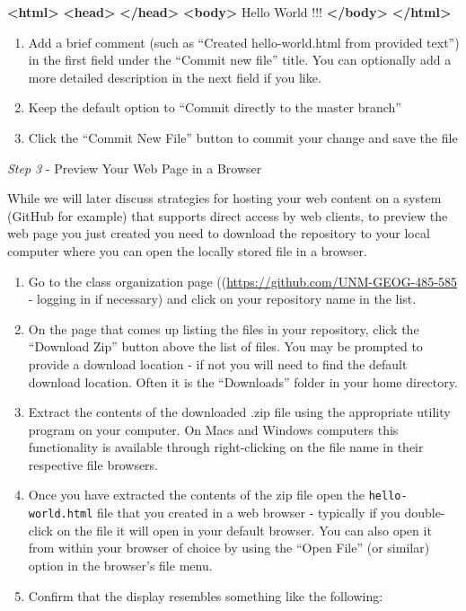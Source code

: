 \documentclass[]{book}
\providecommand{\tightlist}{%
  \setlength{\itemsep}{0pt}\setlength{\parskip}{0pt}}
\newenvironment{Shaded}{}{}
\newcommand{\KeywordTok}[1]{\textcolor[rgb]{0.00,0.44,0.13}{\textbf{{#1}}}}
\newcommand{\NormalTok}[1]{{#1}}
\begin{document}
\begin{Shaded}
\begin{Highlighting}[numbers=left,,]
\KeywordTok{<html>}
    \KeywordTok{<head>}
    \KeywordTok{</head>}     
    \KeywordTok{<body>}
        \NormalTok{Hello World !!!}
    \KeywordTok{</body>} 
\KeywordTok{</html>}
\end{Highlighting}
\end{Shaded}

\begin{enumerate}
\def\labelenumi{\arabic{enumi}.}
\setcounter{enumi}{4}
\tightlist
\item
  Add a brief comment (such as ``Created hello-world.html from provided
  text'') in the first field under the ``Commit new file'' title. You
  can optionally add a more detailed description in the next field if
  you like.
\item
  Keep the default option to ``Commit directly to the master branch''
\item
  Click the ``Commit New File'' button to commit your change and save
  the file
\end{enumerate}

\emph{Step 3} - Preview Your Web Page in a Browser

While we will later discuss strategies for hosting your web content on a
system (GitHub for example) that supports direct access by web clients,
to preview the web page you just created you need to download the
repository to your local computer where you can open the locally stored
file in a browser.

\begin{enumerate}
\def\labelenumi{\arabic{enumi}.}
\tightlist
\item
  Go to the class organization page
  ((\url{https://github.com/UNM-GEOG-485-585} - logging in if necessary)
  and click on your repository name in the list.
\item
  On the page that comes up listing the files in your repository, click
  the ``Download Zip'' button above the list of files. You may be
  prompted to provide a download location - if not you will need to find
  the default download location. Often it is the ``Downloads'' folder in
  your home directory.
\item
  Extract the contents of the downloaded .zip file using the appropriate
  utility program on your computer. On Macs and Windows computers this
  functionality is available through right-clicking on the file name in
  their respective file browsers.
\item
  Once you have extracted the contents of the zip file open the
  \texttt{hello-world.html} file that you created in a web browser -
  typically if you double-click on the file it will open in your default
  browser. You can also open it from within your browser of choice by
  using the ``Open File'' (or similar) option in the browser's file
  menu.
\item
  Confirm that the display resembles something like the following:
\end{enumerate}
\end{document}
